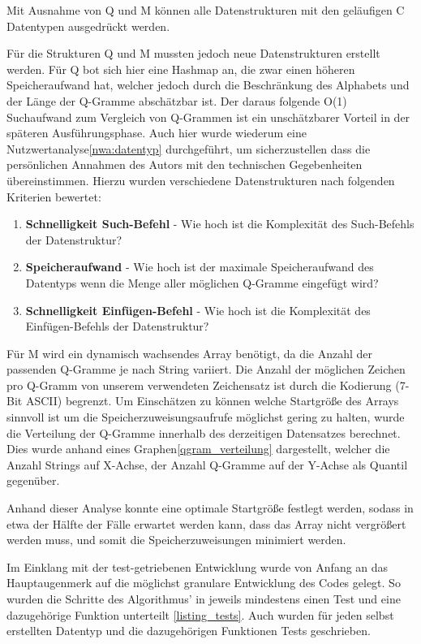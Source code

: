 Mit Ausnahme von Q und M können alle Datenstrukturen mit den geläufigen C
Datentypen ausgedrückt werden.

Für die Strukturen Q und M mussten jedoch neue Datenstrukturen
erstellt werden. Für Q bot sich hier eine Hashmap an, die zwar einen höheren Speicheraufwand hat, welcher jedoch durch die Beschränkung des Alphabets und der Länge der Q-Gramme abschätzbar ist\footnotemark. Der daraus folgende
O(1) Suchaufwand zum Vergleich von Q-Grammen ist ein unschätzbarer Vorteil in der
späteren Ausführungsphase. Auch hier wurde wiederum eine Nutzwertanalyse\ref{nwa:datentyp} durchgeführt,
um sicherzustellen dass die persönlichen Annahmen des Autors mit den technischen
Gegebenheiten übereinstimmen.
Hierzu wurden verschiedene Datenstrukturen nach folgenden Kriterien bewertet:

\begin{enumerate}
	\item \textbf{Schnelligkeit Such-Befehl} - Wie hoch ist die Komplexität des Such-Befehls der Datenstruktur?
    \item \textbf{Speicheraufwand} - Wie hoch ist der maximale Speicheraufwand des Datentyps wenn die Menge aller möglichen Q-Gramme eingefügt wird?
    \item \textbf{Schnelligkeit Einfügen-Befehl} - Wie hoch ist die Komplexität des Einfügen-Befehls der Datenstruktur?\\

\end{enumerate}

Für M wird ein dynamisch wachsendes Array benötigt, da die Anzahl der passenden
Q-Gramme je nach String variiert. Die Anzahl der möglichen Zeichen pro Q-Gramm von unserem verwendeten Zeichensatz ist durch die Kodierung (7-Bit ASCII) begrenzt. Um Einschätzen zu können welche Startgröße des Arrays sinnvoll ist um die Speicherzuweisungsaufrufe möglichst gering zu halten, wurde die Verteilung der Q-Gramme innerhalb des derzeitigen Datensatzes berechnet. Dies wurde anhand eines
Graphen\ref{qgram_verteilung} dargestellt, welcher die Anzahl Strings auf X-Achse, der Anzahl Q-Gramme auf der Y-Achse als Quantil gegenüber.

Anhand dieser Analyse konnte eine optimale Startgröße festlegt werden, sodass in etwa der Hälfte der Fälle
erwartet werden kann, dass das Array nicht vergrößert werden muss, und somit die
Speicherzuweisungen minimiert werden.


Im Einklang mit der test-getriebenen Entwicklung wurde von Anfang an das Hauptaugenmerk
auf die möglichst granulare Entwicklung des Codes gelegt. So wurden die Schritte
des Algorithmus' in jeweils mindestens einen Test und eine dazugehörige Funktion unterteilt \ref{listing_tests}.
Auch wurden für jeden selbst erstellten Datentyp und die dazugehörigen Funktionen Tests geschrieben.

